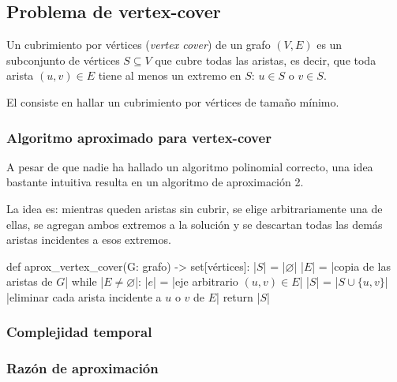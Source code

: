 \subsection{Problema de vertex-cover}

Un cubrimiento por vértices (\textit{vertex cover}) de un grafo \((V,E)\) es un subconjunto de vértices \(S\subseteq V\) que cubre todas las aristas, es decir, que toda arista \((u,v) \in E\) tiene al menos un extremo en \(S\): \(u\in S\) o \(v\in S\).

El  consiste en hallar un cubrimiento por vértices de tamaño mínimo.

\subsubsection{Algoritmo aproximado para vertex-cover}
\label{sec:vertex_cover_aproximado}

A pesar de que nadie ha hallado un algoritmo polinomial correcto, una idea bastante intuitiva resulta en un algoritmo de aproximación 2.

La idea es: mientras queden aristas sin cubrir, se elige arbitrariamente una de ellas, se agregan ambos extremos a la solución y se descartan todas las demás aristas incidentes a esos extremos.

\begin{pseudocode}
def aprox_vertex_cover(G: grafo) -> set[vértices]:
    |\(S\)| = |\(\varnothing\)|
    |\(E\)| = |\textrm{copia de las aristas de }\(G\)| 
    while |\(E \neq \varnothing\)|:
        |\(e\)| = |\textrm{eje arbitrario }\((u, v) \in E\)| 
        |\(S\)| = |\(S \cup \{u, v\}\)|
        |\textrm{eliminar cada arista incidente a }\(u\)\textrm{ o }\(v\)\textrm{ de }\(E\)|
    return |\(S\)|
\end{pseudocode}
\label{impl:vertex_cover_aproximado}

\subsubsection{Complejidad temporal}



\subsubsection{Razón de aproximación}